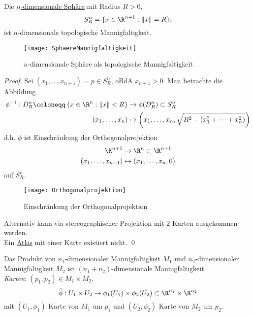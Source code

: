 \begin{example}
\begin{enumerate}
    \begin{minipage}{.45\textwidth}
      \item Die \hyperref[bsp:einheitssphaere]{\( n \)-dimensionale Sphäre} mit Radius \( R > 0 \),
      \begin{equation*}
        S^n_R = \{ x \in \R^{n+1} : \Vert x \Vert = R \}\text{,}
      \end{equation*}
      ist \( n \)-dimensionale topologische Mannigfaltigkeit.
    \end{minipage}
    \hfill
    \begin{minipage}{.45\textwidth}
      \begin{figure}[H]
        \texttt{[image: SphaereMannigfaltigkeit]}
        \caption{\( n \)-dimensionale Sphäre als topologische Mannigfaltigkeit}
      \end{figure}
    \end{minipage}
    \begin{proof}
      Sei \( (x_1, \dots, x_{n+1}) = p \in S^n_R \), oBdA \( x_{n+1} > 0 \). Man betrachte die Abbildung
      \begin{align*}
        \phi^{-1} : D^n_R \coloneqq \left \{ x \in \R^n : \Vert x \Vert < R \right \} &\to \phi(D^n_R) \subset S^n_R \\
          (x_1, \dots, x_n) &\mapsto \left(x_1, \dots, x_n, \sqrt{R^2-(x_1^2 + \cdots + x_n^2)}\right)
      \end{align*}
      d.h. \( \phi \) ist Einschränkung der Orthogonalprojektion
      \begin{align*}
        \R^{n+1} &\to \R^n \subset \R^{n+1} \\
          (x_1, \dots, x_{n+1}) &\mapsto (x_1, \dots, x_n, 0)
      \end{align*}
      auf \( S_R^n \).
      \begin{figure}[H]
        \texttt{[image: Orthogonalprojektion]}
        \caption{Einschränkung der Orthogonalprojektion}
      \end{figure}
      Alternativ kann via stereographischer Projektion mit \( 2 \) Karten ausgekommen werden. \\
      Ein \hyperref[def:atlas]{Atlas} mit einer Karte existiert nicht. \qed{}
    \end{proof}
    \item Das Produkt von \( n_1 \)-dimensionaler Mannigfaltigkeit \( M_1 \) und \( n_2 \)-dimensionaler Mannigfaltigkeit \( M_2 \) ist \( (n_1+n_2) \)-dimensionale Mannigfaltigkeit. \\
    \emph{Karten}: \( (p_1, p_2) \in M_1 \times M_2 \),
    \begin{equation*}
      \widetilde{\phi} : U_1 \times U_2 \to \phi_1(U_1) \times \phi_2(U_2) \subset \R^{n_1} \times \R^{n_2}
    \end{equation*}
    mit \( (U_1, \phi_1) \) Karte von \( M_1 \) um \( p_1 \) und \( (U_2, \phi_2) \) Karte von \( M_2 \) um \( p_2 \).
  \end{enumerate}
\end{example}

